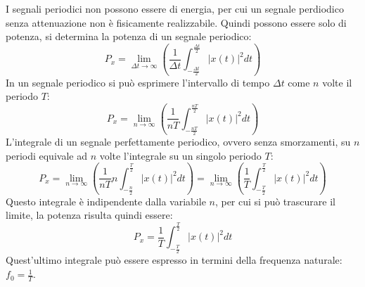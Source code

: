 \documentclass{article}
\numberwithin{equation}{subsection}
\begin{document}
I segnali periodici non possono essere di energia, per cui un segnale perdiodico senza attenuazione non è fisicamente realizzabile. Quindi possono essere solo di potenza, 
si determina la potenza di un segnale periodico:
\begin{equation*}
    P_x=\lim_{\Delta t\to\infty}\displaystyle\left(\frac{1}{\Delta t}\int_{-\frac{\Delta t}{2}}^{\frac{\Delta t}{2}}|x(t)|^2dt\right)
\end{equation*}
In un segnale periodico si può esprimere l'intervallo di tempo $\Delta t$ come $n$ volte il periodo $T$:
\begin{equation*}
    P_x=\lim_{n\to\infty}\displaystyle\left(\frac{1}{n T}\int_{-\frac{nT}{2}}^{\frac{nT}{2}}|x(t)|^2dt\right)
\end{equation*}
L'integrale di un segnale perfettamente periodico, ovvero senza smorzamenti, su $n$ periodi equivale ad $n$ volte l'integrale su un singolo periodo $T$:
\begin{equation*}
    P_x=\lim_{n\to\infty}\displaystyle\left(\frac{1}{n T}n\int_{-\frac{n}{2}}^{\frac{T}{2}}|x(t)|^2dt\right)=\lim_{n\to\infty}\displaystyle\left(\frac{1}{T}\int_{-\frac{T}{2}}^{\frac{T}{2}}|x(t)|^2dt\right)
\end{equation*} 
Questo integrale è indipendente dalla variabile $n$, per cui si può trascurare il limite, la potenza risulta quindi essere:
\begin{equation}
    P_x=\displaystyle\frac{1}{T}\int_{-\frac{T}{2}}^{\frac{T}{2}}|x(t)|^2dt
\end{equation}
Quest'ultimo integrale può essere espresso in termini della frequenza naturale: $f_0=\frac{1}{T}$. 
\end{document}
